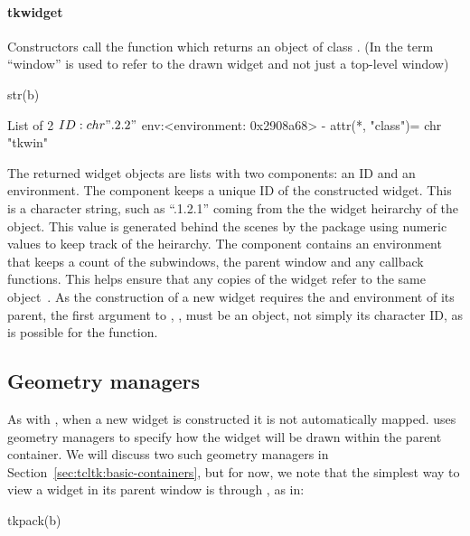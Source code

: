 \paragraph{tkwidget}
Constructors call the  function which returns an
object of class . (In \TK\/ the term ``window'' is used to
refer to the drawn widget and not just a top-level window)

\begin{Schunk}
\begin{Sinput}
 str(b)
\end{Sinput}
\begin{Soutput}
List of 2
 $ ID : chr ".2.2"
 $ env:<environment: 0x2908a68> 
 - attr(*, "class")= chr "tkwin"
\end{Soutput}
\end{Schunk}

The returned widget objects are lists with two components: an ID and an
environment. The  component keeps a unique ID of the
constructed widget. This is a character string, such as ``.1.2.1''
coming from the the widget heirarchy of the object. This value is
generated behind the scenes by the  package using numeric
values to keep track of the heirarchy. The  component
contains an environment that keeps a count of the subwindows, the parent
window and any callback functions. This helps ensure that any copies
of the widget refer to the same object~\citep{Dalgaard-DSC}. As the
construction of a new widget requires the  and environment of
its parent, the first argument to , ,
must be an \R\/ \TK\/ object, not simply its character ID, as is
possible for the  function.



\subsection{Geometry managers}
\label{sec:tcltk:overview:geometry-managers}

As with \Qt, when a new widget is constructed it is not automatically
mapped. \TK\/ uses geometry managers to specify how the widget will be
drawn within the parent container. We will discuss two such geometry
managers in Section~\ref{sec:tcltk:basic-containers}, but for now, we note
that the simplest way to view a widget in its parent window is through
, as in:
\begin{Schunk}
\begin{Sinput}
 tkpack(b)
\end{Sinput}
\end{Schunk}

